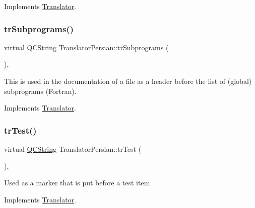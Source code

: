 Implements \mbox{\hyperlink{class_translator}{Translator}}.

\mbox{\label{class_translator_persian_a3ffef49639f759ede302bc316ca0bafa}} 
\subsubsection{\texorpdfstring{trSubprograms()}{trSubprograms()}}
{\footnotesize\ttfamily virtual \mbox{\hyperlink{class_q_c_string}{Q\+C\+String}} Translator\+Persian\+::tr\+Subprograms (\begin{DoxyParamCaption}{ }\end{DoxyParamCaption})\hspace{0.3cm}{\ttfamily [inline]}, {\ttfamily [virtual]}}

This is used in the documentation of a file as a header before the list of (global) subprograms (Fortran). 

Implements \mbox{\hyperlink{class_translator}{Translator}}.

\mbox{\label{class_translator_persian_a0f11e9efb7202bd1fb8f2d51bd6910d4}} 
\subsubsection{\texorpdfstring{trTest()}{trTest()}}
{\footnotesize\ttfamily virtual \mbox{\hyperlink{class_q_c_string}{Q\+C\+String}} Translator\+Persian\+::tr\+Test (\begin{DoxyParamCaption}{ }\end{DoxyParamCaption})\hspace{0.3cm}{\ttfamily [inline]}, {\ttfamily [virtual]}}

Used as a marker that is put before a test item 

Implements \mbox{\hyperlink{class_translator}{Translator}}.

\mbox{\label{class_translator_persian_a36515ff6487ffa6335f765ea0a715408}} 
